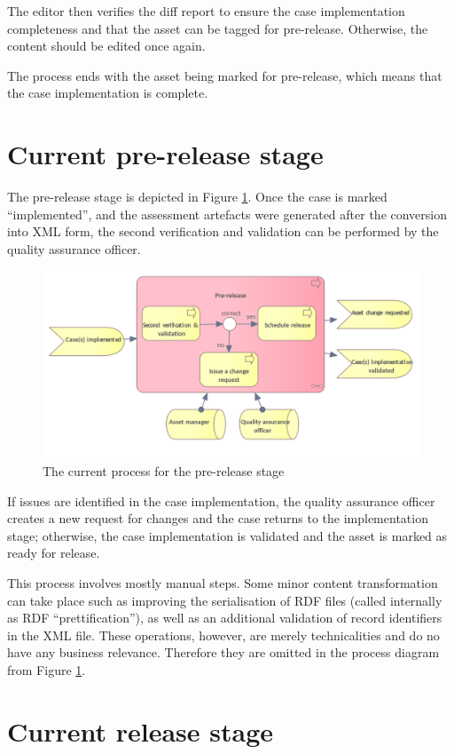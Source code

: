 	The editor then verifies the diff report to ensure the case implementation completeness and that the asset can be tagged for pre-release. Otherwise, the content should be edited once again. 
	
	The process ends with the asset being marked for pre-release, which means that the case implementation is complete.
	
	\section{Current pre-release stage}
	\label{sec:pre-release-current}	

	The pre-release stage is depicted in Figure \ref{fig:pre-release-current}. Once the case is marked ``implemented'', and the assessment artefacts were generated after the conversion into XML form, the second verification and validation can be performed by the quality assurance officer. 
	
	\begin{figure}[h]
		\centering
		\includegraphics[width=.65\textwidth]{images/business/current/Pre-release.png}
		\caption{The current process for the pre-release stage}
		\label{fig:pre-release-current}
	\end{figure}

	If issues are identified in the case implementation, the quality assurance officer creates a new request for changes and the case returns to the implementation stage; otherwise, the case implementation is validated and the asset is marked as ready for release. 
	
	This process involves mostly manual steps. Some minor content transformation can take place such as improving the serialisation of RDF files (called internally as RDF ``prettification''), as well as an additional validation of record identifiers in the XML file. These operations, however, are merely technicalities and do no have any business relevance. Therefore they are omitted in the process diagram from Figure \ref{fig:pre-release-current}. 

	\section{Current release stage}
	\label{sec:release-current}
	
